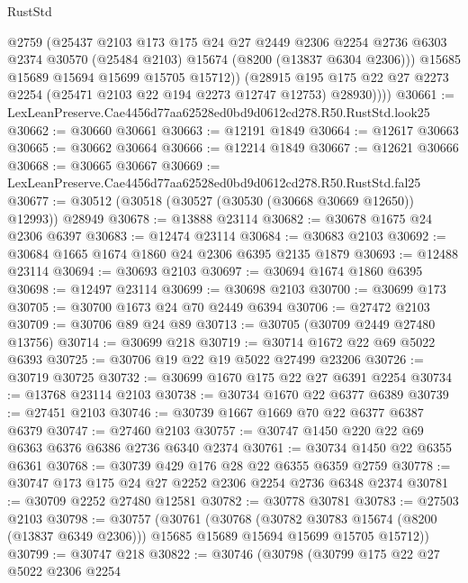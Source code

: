 \begin{lexlean}{RustStd}
\begin{coremodule}
              @2759
              (@25437
                @2103
                @173
                @175
                @24
                @27
                @2449
                @2306
                @2254
                @2736
                @6303
                @2374
                @30570
                (@25484 @2103)
                @15674
                (@8200 (@13837 @6304 @2306)))
              @15685
              @15689
              @15694
              @15699
              @15705
              @15712))
          (@28915
            @195
            @175
            @22
            @27
            @2273
            @2254
            (@25471 @2103 @22 @194 @2273 @12747 @12753)
            @28930))))
@30661 := LexLeanPreserve.Cae4456d77aa62528ed0bd9d0612cd278.R50.RustStd.look25
@30662 := @30660 @30661
@30663 := @12191 @1849
@30664 := @12617 @30663
@30665 := @30662 @30664
@30666 := @12214 @1849
@30667 := @12621 @30666
@30668 := @30665 @30667
@30669 := LexLeanPreserve.Cae4456d77aa62528ed0bd9d0612cd278.R50.RustStd.fal25
@30677 := @30512 (@30518 (@30527 (@30530 (@30668 @30669 @12650)) @12993)) @28949
@30678 := @13888 @23114
@30682 := @30678 @1675 @24 @2306 @6397
@30683 := @12474 @23114
@30684 := @30683 @2103
@30692 := @30684 @1665 @1674 @1860 @24 @2306 @6395 @2135 @1879
@30693 := @12488 @23114
@30694 := @30693 @2103
@30697 := @30694 @1674 @1860 @6395
@30698 := @12497 @23114
@30699 := @30698 @2103
@30700 := @30699 @173
@30705 := @30700 @1673 @24 @70 @2449 @6394
@30706 := @27472 @2103
@30709 := @30706 @89 @24 @89
@30713 := @30705 (@30709 @2449 @27480 @13756)
@30714 := @30699 @218
@30719 := @30714 @1672 @22 @69 @5022 @6393
@30725 := @30706 @19 @22 @19 @5022 @27499 @23206
@30726 := @30719 @30725
@30732 := @30699 @1670 @175 @22 @27 @6391 @2254
@30734 := @13768 @23114 @2103
@30738 := @30734 @1670 @22 @6377 @6389
@30739 := @27451 @2103
@30746 := @30739 @1667 @1669 @70 @22 @6377 @6387 @6379
@30747 := @27460 @2103
@30757 := @30747 @1450 @220 @22 @69 @6363 @6376 @6386 @2736 @6340 @2374
@30761 := @30734 @1450 @22 @6355 @6361
@30768 := @30739 @429 @176 @28 @22 @6355 @6359 @2759
@30778 := @30747 @173 @175 @24 @27 @2252 @2306 @2254 @2736 @6348 @2374
@30781 := @30709 @2252 @27480 @12581
@30782 := @30778 @30781
@30783 := @27503 @2103
@30798 := @30757
    (@30761
      (@30768
        (@30782 @30783 @15674 (@8200 (@13837 @6349 @2306)))
        @15685
        @15689
        @15694
        @15699
        @15705
        @15712))
@30799 := @30747 @218
@30822 := @30746
    (@30798
      (@30799
        @175
        @22
        @27
        @5022
        @2306
        @2254

\end{coremodule}
\end{lexlean}
